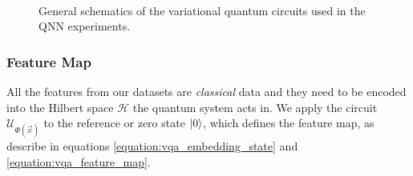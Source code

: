 \begin{figure}[!ht]
    \\[3em]
    \begin{subfigure}{1.0\textwidth}
        \centering
    	\label{subfigure:general_layer_schematics_quantum_circuits_qnn}
    \end{subfigure}
    \caption{General schematics of the variational quantum circuits used in the QNN experiments.}
    \label{fig:general_schematics_quantum_circuits_qnn}
\end{figure}

\subsubsection{Feature Map}
All the features from our datasets are \textit{classical} data and they need to be encoded into the Hilbert space $\mathcal{H}$ the quantum system acts in. We apply the circuit $\mathcal{U}_{\Phi(\Vec{x})}$ to the reference or zero state $\ket{0}$, which defines the feature map, as describe in equations \ref{equation:vqa_embedding_state} and \ref{equation:vqa_feature_map}.

